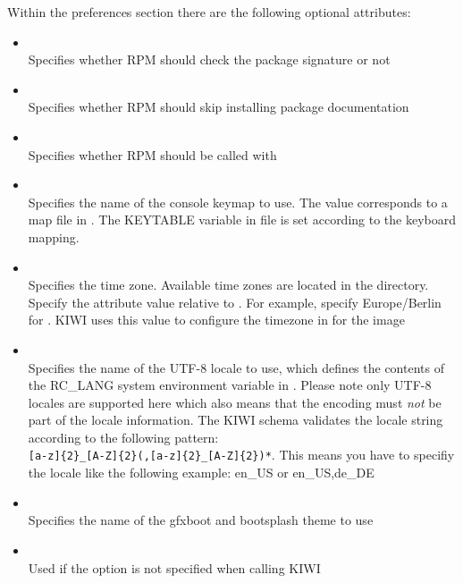 Within the preferences section there are the following optional
attributes:

\begin{itemize}
\item {}\\
      Specifies whether RPM should check the package signature or not
\item {}\\
      Specifies whether RPM should skip installing package documentation
\item {}\\
      Specifies whether RPM should be called with 
\item {}\\
      Specifies the name of the console keymap to use. The value corresponds
      to a map file in . The KEYTABLE variable in
       file is set according to the keyboard
      mapping.
\item {}\\
      Specifies the time zone. Available time zones are located in the
       directory. Specify the attribute value relative to
      . For example, specify Europe/Berlin for
      . KIWI uses this value to configure
      the timezone in  for the image
\item {}\\
      Specifies the name of the UTF-8 locale to use, which defines the
      contents of the RC\_LANG system environment variable in
      . Please note only UTF-8 locales are supported
      here which also means that the encoding must \emph{not} be part of
      the locale information. The KIWI schema validates the locale string
      according to the following pattern:\\
      \verb+[a-z]{2}_[A-Z]{2}(,[a-z]{2}_[A-Z]{2})*+.
      This means you have to specifiy the locale like the following example:
      en\_US or en\_US,de\_DE
\item {}\\
      Specifies the name of the gfxboot and bootsplash theme to use
\item {}\\
      Used if the  option is not specified when calling KIWI

\end{itemize}
